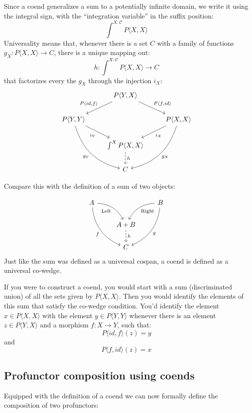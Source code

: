 \documentclass[DaoFP]{subfiles}
\begin{document}
Since a coend generalizes a sum to a potentially infinite domain, we write it using the integral sign, with the ``integration variable'' in the suffix position:
\[ \int^{X\colon \mathcal{C}} P \langle X, X \rangle \]
Universality means that, whenever there is a set $C$ with a family of functions $g_X \colon P \langle X, X \rangle \to C$, there is a unique mapping out:
\[ h \colon \int^{X\colon \mathcal{C}} P \langle X, X \rangle \to C \]
that factorizes every the $g_X$ through the injection $i_X$:
\[
 \begin{tikzcd}
 &P \langle Y, X \rangle
 \arrow[ld, "{P \langle id, f \rangle}"']
 \arrow[rd, "{P \langle f, id \rangle}"]
 \\
 P \langle Y, Y \rangle
 \arrow[dr, "i_Y"']
 \arrow[ddr, bend right,  "g_Y"']
 &&P \langle X, X \rangle
 \arrow[dl, "i_X"]
 \arrow[ddl, bend left,  "g_X"]
 \\
 &\int^X P \langle X, X \rangle
 \arrow[d, dashed, "h"]
 \\
 &C
 \end{tikzcd}
\]

Compare this with the definition of a sum of two objects:

\[
 \begin{tikzcd}
 A
 \arrow[dr,  bend left, "\text{Left}"']
 \arrow[ddr, bend right, "f"']
 && B
 \arrow[dl, bend right, "\text{Right}"]
 \arrow[ddl, bend left, "g"]
 \\
&A + B
\arrow[d, dashed, "h"]
\\
& C
 \end{tikzcd}
\]
Just like the sum was defined as a universal cospan, a coend is defined as a universal co-wedge. 

If you were to construct a coend, you would start with a sum (discriminated union) of all the sets given by $P \langle X, X \rangle$. Then you would identify the elements of this sum that satisfy the co-wedge condition. You'd identify the element $x \in P \langle X, X \rangle$ with the element $y \in P \langle Y, Y \rangle$ whenever there is an element $z  \in P \langle Y, X \rangle$ and a morphism $f \colon X \to Y$, such that:
\[ P \langle id, f \rangle (z) = y\]
and
\[ P \langle f, id \rangle (z) = x\]

\subsection{Profunctor composition using coends}

Equipped with the definition of a coend we can now formally define the composition of two profunctors:
\end{document}
